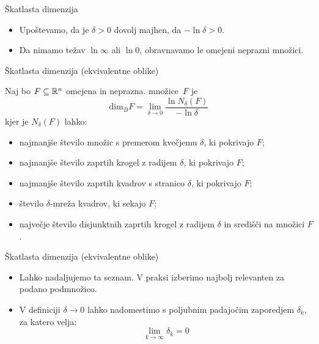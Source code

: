 \documentclass[10pt]{beamer}
\begin{document}
\begin{frame}[t]{Škatlasta dimenzija}  
    \begin{opomba}
        \begin{itemize}
            \item Upoštevamo, da je \(\delta > 0\) dovolj majhen, da \(- \ln \delta > 0\).
            \item Da nimamo težav \(\ln \infty\) ali \(\ln 0\), obravnavamo le omejeni neprazni množici.
        \end{itemize}
    \end{opomba}
\end{frame}

\begin{frame}[t]{Škatlasta dimenzija (ekvivalentne oblike)}  
    \begin{definicija}
        Naj bo \(F \subseteq \mathbb{R}^n\) omejena in neprazna.  množice~\(F\) je 
        \[\text{dim}_B F = \lim_{\delta \to 0} \frac{\ln N_\delta(F)}{-\ln \delta}\]
        kjer je \(N_\delta(F)\) lahko:
        \begin{itemize}
            \item najmanjše število množic s premerom kvečjemu \(\delta\), ki pokrivajo \(F\);
            \item najmanjše število zaprtih krogel z radijem \(\delta\), ki pokrivajo \(F\);
            \item najmanjše število zaprtih kvadrov s stranico \(\delta\), ki pokrivajo \(F\);
            \item število \(\delta\)-mreža kvadrov, ki sekajo \(F\);
            \item največje število disjunktnih zaprtih krogel z radijem \(\delta\) in središči na množici \(F\).
        \end{itemize}
    \end{definicija}
\end{frame}

\begin{frame}[t]{Škatlasta dimenzija (ekvivalentne oblike)}  
    \begin{opomba}
        \begin{itemize}
            \item Lahko nadaljujemo ta seznam. V praksi izberimo najbolj relevanten za podano podmnožico.
            \item V definiciji \(\delta \to 0\) lahko nadomestimo s poljubnim padajočim zaporedjem \(\delta_k\), za katero velja: 
            \[\lim_{k \to \infty} \delta_k = 0\]
        \end{itemize}
        
    \end{opomba}
\end{frame}
\end{document}

